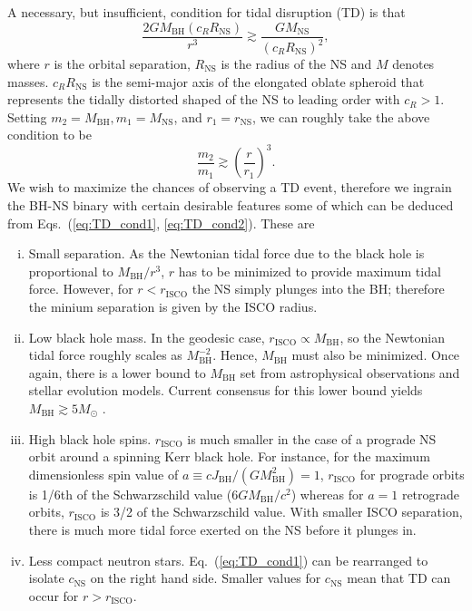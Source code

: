 \documentclass[amsmath,amssymb,aps,floats,amsfonts,notitlepage,superscriptaddress,eqsecnum,nofootinbib,10pt]{revtex4-1}
\newcommand{\f}{\frac}
\newcommand{\be}{\begin{equation}}
\newcommand{\ee}{\end{equation}}
\begin{document}
A necessary, but insufficient, condition for tidal disruption (TD) is that
\be
\f{2 G M_\text{BH} (c_R R_\text{NS})}{r^3} \gtrsim \f{G M_\text{NS}}{(c_R R_\text{NS})^2} \label{eq:TD_cond1},
\ee
where $r$ is the orbital separation, $R_\text{NS}$ is the radius of the NS and $M$ denotes masses. 
$c_R R_\text{NS}$ is the semi-major axis of the elongated oblate spheroid that represents the tidally distorted shaped of the NS to leading order with
$c_R >1 $. Setting $m_2= M_\text{BH}, m_1 = M_\text{NS}$, and $r_1=r_\text{NS}$, we can roughly take the above condition to be
%
\be
\f{m_2}{m_1} \gtrsim \left(\f{r}{r_1}\right)^3 \label{eq:TD_cond2}.
\ee
%
We wish to maximize the chances of observing a TD event, therefore we ingrain the BH-NS binary with certain desirable features
some of which can be deduced from Eqs.~(\ref{eq:TD_cond1}, \ref{eq:TD_cond2}). These are
%
%
\begin{enumerate}[(i)]
 \item Small separation. As the Newtonian tidal force due to the black hole is proportional to $M_\text{BH}/r^3$, $r$ has to be
 minimized to provide maximum tidal force. 
 However, for $r< r_\text{ISCO}$ the NS simply plunges into the BH; therefore the minium separation is given by the ISCO radius.
 \item Low black hole mass. In the geodesic case, $r_\text{ISCO} \propto M_\text{BH}$, so the Newtonian tidal force roughly scales as $M_\text{BH}^{-2}$. 
 Hence, $M_\text{BH}$ must also be minimized. Once again, there is a lower bound to $M_\text{BH}$ set from astrophysical observations and stellar evolution models.
 Current consensus for this lower bound yields $M_\text{BH} \gtrsim 5 M_\odot$ \cite{Farr:2010tu, Raithel:2017nlc, Ozel:2010su, Wiktorowicz:2013dua}.
 \item High black hole spins. $r_\text{ISCO}$ is much smaller in the case of a prograde NS orbit around a spinning Kerr black hole.
 For instance, for the maximum dimensionless spin value of $a\equiv c J_\text{BH}/(G M^2_\text{BH})=1$, $r_\text{ISCO}$ for prograde orbits is 1/6th of the Schwarzschild value ($6GM_\text{BH}/c^2$) whereas for $a=1$ retrograde orbits, $r_\text{ISCO}$ is 3/2 of the Schwarzschild value.
 With smaller ISCO separation, there is much more tidal force exerted on the NS before it plunges in.
 \item Less compact neutron stars. Eq.~(\ref{eq:TD_cond1}) can be rearranged to isolate $c_\text{NS}$
 on the right hand side. Smaller values for $c_\text{NS}$ mean that TD can occur for $r>r_\text{ISCO}$.
\end{enumerate}
\end{document}
